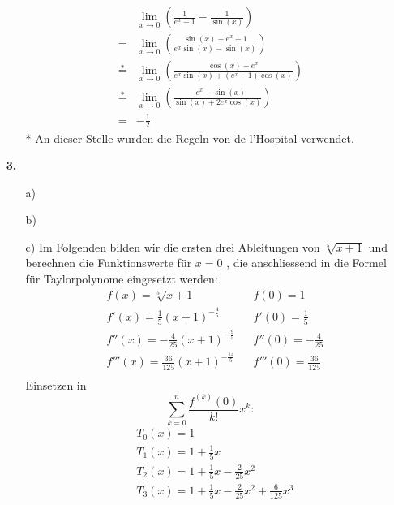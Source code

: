 \documentclass[a4paper,11pt]{article}
\begin{document}
\begin{enumerate}
\begin{enumerate}
                    \begin{align*}
                        &\underset{x \to 0}{\lim} \left( \frac{1}{e^x -1}-\frac{1}{\sin(x)} \right)\\
                        =&\underset{x \to 0}{\lim} \left( \frac{\sin(x) - e^x + 1}{e^x \sin(x) - \sin(x)} \right)\\
                        \overset{*}{=}&\underset{x \to 0}{\lim} \left( \frac{\cos(x) - e^x}{e^x \sin(x) +(e^x -1) \cos(x)} \right)\\
                        \overset{*}{=}&\underset{x \to 0}{\lim} \left( \frac{-e^x - \sin(x)}{\sin(x) +2e^x \cos(x)} \right)\\
                        =& -\frac{1}{2}
                    \end{align*}
                    * An dieser Stelle wurden die Regeln von de l'Hospital verwendet.
            \end{enumerate}

        \item[\textbf{3.}]
            \begin{enumerate}
                \item [a)]
                \item[b)]
                \item[c)]
                Im Folgenden bilden wir die ersten drei Ableitungen von $\sqrt[5]{x+1}$ und berechnen die Funktionswerte für $x = 0$ , die anschliessend in die Formel für Taylorpolynome eingesetzt werden:
                \begin{align*}
                &f(x) = \sqrt[5]{x+1} && f(0) = 1 \\
                &f'(x) = \frac{1}{5}(x+1)^{-\frac{4}{5}} && f'(0) = \frac{1}{5} \\
                &f''(x) = -\frac{4}{25}(x+1)^{-\frac{9}{5}} && f''(0) = -\frac{4}{25} \\
                &f'''(x) = \frac{36}{125}(x+1)^{-\frac{14}{5}} && f'''(0) = \frac{36}{125} \\
                \end{align*}
                Einsetzen in $$\sum_{k=0}^{n} \frac{f^{(k)}(0)}{k!}x^k:$$ 
                \begin{align*}
                &T_0(x) = 1 \\
                &T_1(x) = 1 + \frac{1}{5}x \\
                &T_2(x) = 1 + \frac{1}{5}x -\frac{2}{25}x^2 \\
                &T_3(x) = 1 + \frac{1}{5}x -\frac{2}{25}x^2 + \frac{6}{125}x^3 \\
                \end{align*}
            \end{enumerate}


\end{enumerate}
\end{document}
